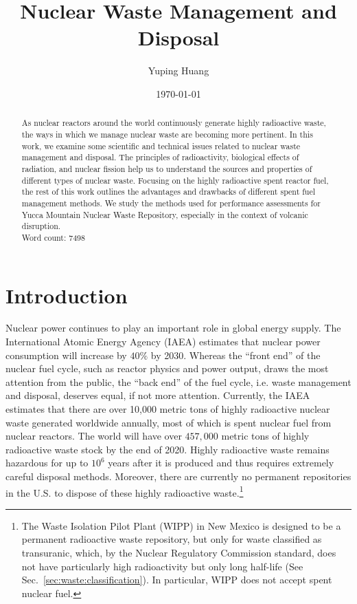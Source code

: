 \documentclass[nofootinbib,preprint,aps]{revtex4-1}
\begin{document}
\title{Nuclear Waste Management and Disposal}

\author{Yuping Huang}%

\date{\today}%
\begin{abstract}
    As nuclear reactors around the world continuously generate highly radioactive waste,
    the ways in which we manage nuclear waste are becoming more pertinent. In this work,
    we examine some scientific and technical issues related to nuclear waste management and disposal.
    The principles of radioactivity, biological effects of radiation, and nuclear fission help us to understand the sources and properties
    of different types of nuclear waste. Focusing on the highly radioactive spent reactor fuel, the rest
    of this work outlines the advantages and drawbacks of different spent fuel management
    methods. We study the methods used for performance assessments for Yucca Mountain Nuclear Waste Repository,
    especially in the context of volcanic disruption.\\
    Word count: 7498
\end{abstract}
\maketitle
\tableofcontents
\newpage
\section{Introduction}
Nuclear power continues to play an important role in global energy supply.
The International Atomic Energy Agency (IAEA) estimates that nuclear power
consumption will increase by $40\%$ by 2030.\cite{iaea12}
Whereas the ``front end'' of the nuclear fuel cycle, such as reactor physics and power output, draws
the most attention from the public, the ``back end'' of the fuel cycle, i.e. waste management and
disposal, deserves equal, if not more attention.
Currently, the IAEA estimates that there are over 10,000 metric tons of highly radioactive nuclear waste 
generated worldwide annually,
most of which is spent nuclear fuel from nuclear reactors.\cite{iaea08, r12}
The world will have over $457,000$ metric tons of highly radioactive waste stock by the end of 2020.\cite{r12}
Highly radioactive waste remains hazardous for up to $10^6$ years after it is produced and thus
requires extremely careful disposal methods.
Moreover, there are currently no permanent repositories in the U.S. to dispose of these highly radioactive
waste.\footnote{The Waste Isolation Pilot Plant (WIPP) in New Mexico is designed to be a permanent radioactive
    waste repository, but only
for waste classified as transuranic, which, by the Nuclear Regulatory Commission standard, does not have particularly
high radioactivity but only long half-life (See Sec.~\ref{sec:waste:classification}). In particular, WIPP does not accept spent nuclear fuel.\cite[chapt. 4]{aa12}}  
\end{document}
